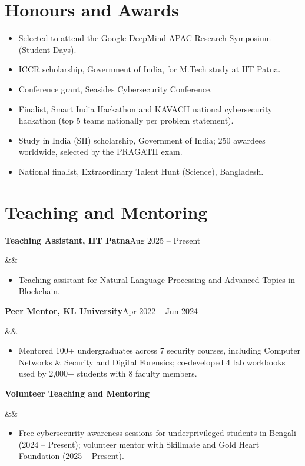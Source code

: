 \documentclass[10pt]{article}
\newcommand{\entry}[3]{%
  \textbf{#1}\hfill{\color{muted}#2}\par
  \ifx&#3&\else{\itshape #3}\par\fi\vspace{-0.1em}}
\begin{document}
\section{Honours and Awards}
\begin{itemize}[leftmargin=4.8em,labelwidth=4.3em,labelsep=0.5em,align=left]
  \item[{\color{muted}2026}] Selected to attend the Google DeepMind APAC Research Symposium (Student Days).
  \item[{\color{muted}2025--27}] ICCR scholarship, Government of India, for M.Tech study at IIT Patna.
  \item[{\color{muted}2025}] Conference grant, Seasides Cybersecurity Conference.
  \item[{\color{muted}2023}] Finalist, Smart India Hackathon and KAVACH national cybersecurity hackathon (top 5 teams nationally per problem statement).
  \item[{\color{muted}2021--25}] Study in India (SII) scholarship, Government of India; 250 awardees worldwide, selected by the PRAGATII exam.
  \item[{\color{muted}2019}] National finalist, Extraordinary Talent Hunt (Science), Bangladesh.
\end{itemize}

\section{Teaching and Mentoring}
\entry{Teaching Assistant, IIT Patna}{Aug 2025 -- Present}{}
\begin{itemize}
  \item Teaching assistant for Natural Language Processing and Advanced Topics in Blockchain.
\end{itemize}
\vspace{0.3em}
\entry{Peer Mentor, KL University}{Apr 2022 -- Jun 2024}{}
\begin{itemize}
  \item Mentored 100+ undergraduates across 7 security courses, including Computer Networks \& Security and Digital Forensics; co-developed 4 lab workbooks used by 2,000+ students with 8 faculty members.
\end{itemize}
\vspace{0.3em}
\entry{Volunteer Teaching and Mentoring}{}{}
\begin{itemize}
  \item Free cybersecurity awareness sessions for underprivileged students in Bengali (2024 – Present); volunteer mentor with Skillmate and Gold Heart Foundation (2025 – Present).
\end{itemize}
\end{document}

